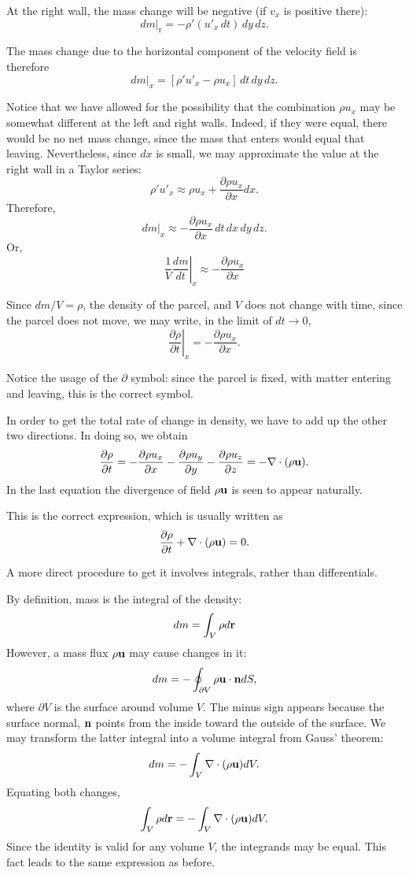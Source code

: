 At the right wall, the mass change will be negative (if $v_x$ is positive
there):
\[
\left. d m \right|_\text{r} =
 -  \rho' ( u'_x \, dt) \, dy\, dz .
\]

The mass change due to the horizontal component of the velocity field is
therefore
\[
\left. d m \right|_x =
  \left[  \rho'  u'_x -  \rho  u_x \right] \, dt \, dy\, dz .
\]

Notice that we have allowed for the possibility that the combination
$\rho u_x$ may be somewhat different at the left and right
walls. Indeed, if they were equal, there would be no net mass change,
since the mass that enters would equal that leaving. Nevertheless,
since $dx$ is small, we may approximate the value at the right
wall in a Taylor series:
\[
\rho'  u'_x \approx  \rho  u_x  +
\frac{\partial  \rho  u_x}{\partial x} dx .
\]
Therefore,
\[
\left. d m \right|_x \approx
-\frac{\partial  \rho  u_x}{\partial x} \, dt \, dx \, dy\, dz .
\]
Or,
\[
\frac1V \left. \frac{d m}{d t} \right|_x \approx
-\frac{\partial  \rho  u_x}{\partial x}
\]

Since $dm/V=\rho$, the density of the parcel, and $V$ does not change with time, since the parcel does not move, we may write, in the
limit of $dt\to 0$,
\[
\left. \frac{\partial \rho}{\partial t} \right|_x =
-\frac{\partial  \rho  u_x}{\partial x} .
\]

Notice the usage of the $\partial$ symbol: since the parcel is
fixed, with matter entering and leaving, this is the correct
symbol.

In order to get the total rate of change in density, we have to
add up the other two directions. In doing so, we obtain
\begin{equation}
  \label{eq:continuity0}
  \frac{\partial \rho}{\partial t} =
  -\frac{\partial  \rho  u_x}{\partial x}
    -\frac{\partial  \rho  u_y}{\partial y}
    -\frac{\partial  \rho  u_z}{\partial z}  =
    -\nabla\cdot ( \rho  \mathbf{u}) .
\end{equation}
In the last equation the divergence of field $ \rho \mathbf{u}$ is
seen to appear naturally.

This is the correct expression, which is usually written as
\begin{equation}
  \label{eq:continuity}
  \frac{\partial \rho }{\partial t} +  \nabla \cdot (\rho \mathbf{u} ) = 0 .
\end{equation}


A more direct procedure to get it involves integrals, rather
than differentials.

By definition, mass is the integral of the density:
\[
d m = \int_V \rho d\mathbf{r}
\]
However, a mass flux $\rho\mathbf{u}$ may cause changes in it:
\[
d m = - \oint_{\partial V} \rho \mathbf{u} \cdot \mathbf{n} dS ,
\]
where $\partial V$ is the surface around volume $V$. The minus sign
appears because the surface normal, $\mathbf{n}$ points from the inside
toward the outside of the surface. We may transform the latter
integral into a volume integral from Gauss' theorem:
\[
d m = - \int_V \nabla\cdot (\rho \mathbf{u} ) dV .
\]
Equating both changes,
\[
\int_V \rho d\mathbf{r} = - \int_V \nabla\cdot (\rho \mathbf{u} ) dV .
\]
Since the identity is valid for any volume $V$, the integrands may
be equal. This fact leads to the same expression as before.


